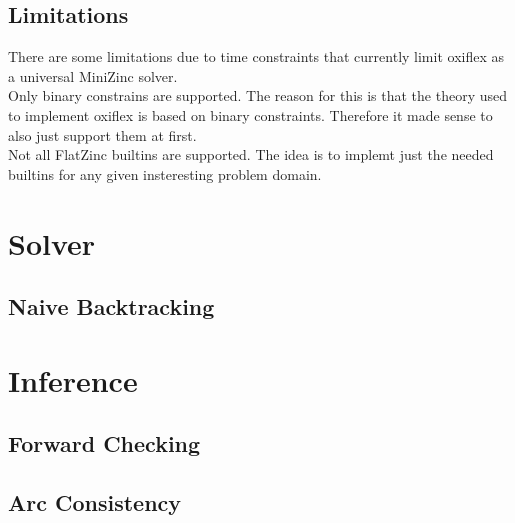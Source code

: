 

\subsection{Limitations}

There are some limitations due to time constraints that currently limit oxiflex as a universal MiniZinc solver. \\

Only binary constrains are supported. The reason for this is that the theory used to implement oxiflex is based on binary constraints. Therefore it made sense to also just support them at first. \\

Not all FlatZinc builtins are supported. The idea is to implemt just the needed builtins for any given insteresting problem domain.

\section{Solver}


\subsection{Naive Backtracking}

\section{Inference} \label{inference}

\subsection{Forward Checking}

\subsection{Arc Consistency}


